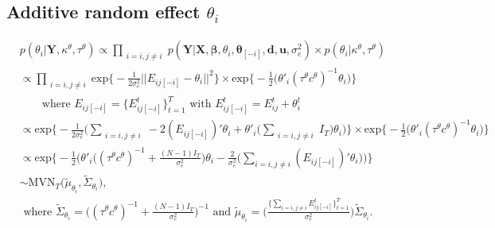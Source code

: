 \documentclass[a4paper]{article}
\begin{document}
\subsection{Additive random effect $\theta_i$} \label{theta}		
		\begin{equation}
		\begin{aligned}
		&p(\theta_{i}|\mathbf{Y}, \kappa^\theta, \tau^\theta) \propto \prod\limits_{\substack{i=i, j\neq i}}p(\mathbf{Y}|\mathbf{X},\boldsymbol{\beta},  \theta_{i}, \boldsymbol{\theta}_{[-i]}, \boldsymbol{d}, \boldsymbol{u},\sigma_e^2) \times p(\theta_{i}|\kappa^\theta, \tau^\theta) \\
		&\propto\prod\limits_{\substack{i=i, j\neq i}}\mbox{exp}\Big\{-\frac{1}{2\sigma_e^2}||E_{ij[-i]}-\theta_{i}||^2\Big\}\times \mbox{exp}\Big\{-\frac{1}{2}\big(\theta'_{i}{(\tau^\theta c^\theta)}^{-1}\theta_{i}\big)\Big\}\\
		& \quad\quad\mbox{where } E_{ij[-i]}=\{E^t_{ij[-i]}\}_{t=1}^T \mbox{ with } E^t_{ij[-i]}=E^t_{ij}+\theta^t_{i}\\
		&\propto\mbox{exp}\Big\{-\frac{1}{2\sigma_e^2}\Big(\sum\limits_{\substack{i=i, j\neq i}}-2(E_{ij[-i]})'\theta_{i}+\theta'_{i}\big(\sum\limits_{\substack{i=i, j\neq i}}I_T\big)\theta_{i}\Big)\Big\}\times \mbox{exp}\Big\{-\frac{1}{2}\big(\theta'_{i}{(\tau^\theta c^\theta)}^{-1}\theta_{i}\big)\Big\}\\
		&\propto\mbox{exp}\Big\{-\frac{1}{2}\Big(\theta'_{i}\big({(\tau^\theta c^\theta)}^{-1}+\frac{(N-1)I_T}{\sigma_e^2}\big)\theta_{i}-\frac{2}{\sigma_e^2}\big(\sum_{i=i, j\neq i}(E_{ij[-i]})'\theta_{i}\big)\Big)\Big\}\\
		& \sim \mbox{MVN}_T\big(\tilde{\mu}_{\theta_i}, \tilde{\Sigma}_{\theta_i} \big),\\
		& \mbox{ where } \tilde{\Sigma}_{\theta_i} = \Big((\tau^\theta c^\theta)^{-1}+\frac{(N-1)I_T}{\sigma_e^2}\Big)^{-1} \mbox{ and }
		\tilde{\mu}_{\theta_i} = \Big(\frac{\{\sum_{i=i, j\neq i}E^{t}_{ij[-i]}\}_{t=1}^{T}}{\sigma_e^2}\Big)\tilde{\Sigma}_{\theta_i}.
		\end{aligned}
		\end{equation} 
\end{document}
